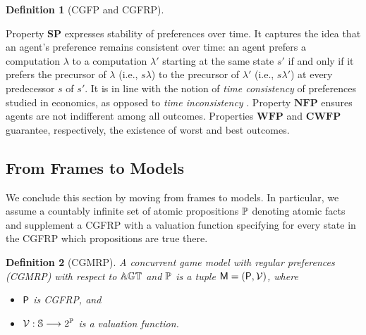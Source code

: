 \documentclass{article}
\newtheorem{definition}{Definition}
\begin{document}
\begin{definition}[CGFP and CGFRP]
\end{definition}
Property $\mathbf{SP}$ expresses stability of preferences over time. 
It captures the idea that an agent's preference remains consistent over time: an agent prefers a computation $\lambda$ to a computation $\lambda'$ starting at the same state $s'$ if and only if it prefers the precursor of $\lambda$ (i.e., $s\lambda$) to the precursor of $\lambda'$ (i.e., $s\lambda'$) at every predecessor $s$ of $s'$.
It  is in line with the notion of \emph{time consistency} of preferences studied in economics, as opposed to \emph{time inconsistency} \cite{Lowewenstein2002}. 
Property $\mathbf{NFP}$ ensures agents are not indifferent among all outcomes. Properties $\mathbf{WFP}$ and $\mathbf{CWFP}$ guarantee, respectively, the existence of worst and best outcomes. 


\subsection{From Frames to Models}\label{CGMRPsect}

We conclude this section by moving from
frames to models. In particular, we
assume a countably infinite  set of atomic
propositions $\AP$
denoting atomic facts and supplement 
a CGFRP  with a valuation function specifying for
every state in the CGFRP which propositions are true there.

\begin{definition}[CGMRP]\label{def: CGMRP}
  A concurrent game model with regular preferences (CGMRP) with respect to $\AGT$ and $\AP$
  is a tuple 
  $\M  = (\P, \V)$,
  where
  \begin{itemize}
  \item $\P$ is CGFRP, and 
  \item $\V: \St \to 2^\AP$ is a valuation function. 
  \end{itemize}
\end{definition}
\end{document}
